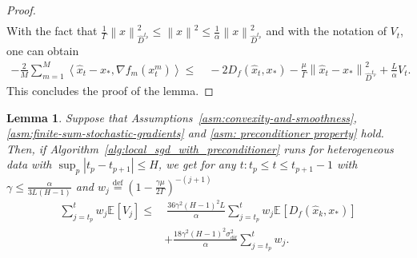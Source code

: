 \documentclass[sn-mathphys,Numbered]{sn-jnl}%
\newtheorem{lemma}{Lemma}%
\renewcommand{\|}{\parallel}
\newcommand\ec[2][]{\ensuremath{\mathbb{E}_{#1} \left[#2\right]}}
\newcommand\ev[1]{\left \langle #1 \right \rangle}
\newcommand\br[1]{\left ( #1 \right )}
\newcommand{\sqn}[1]{{\left\lVert#1\right\rVert}^2}
\newcommand{\abs}[1]{\left\lvert#1\right\rvert}
\newcommand{\eqdef}{\overset{\text{def}}{=}}
\newcommand{\sigmaf}{\sigma_{\mathrm{dif}}}
\renewcommand {\*} {\ast}
\begin{document}
\begin{proof}
\begin{align*}
    \end{align*}
    With the fact that $\frac{1}{\Gamma}\sqn{x}_{\hat{D}^{t_p}} \leq \sqn{x} \leq \frac{1}{\alpha}\sqn{x}_{\hat{D}^{t_p}}$ and with the notation of $V_t$, one can obtain
     \begin{align*}
        -\frac{2 }{M} \sum_{m=1}^{M} \ev{\hat{x}_t - x_\ast, \nabla f_m (x_t^m)} \leq&\ - 2  D_{f} (\hat{x}_t, x_\ast) -  \frac{\mu}{\Gamma} \sqn{\hat{x}_t - x_\ast}_{\hat{D}^{t_p}} +  \frac{L}{\alpha} V_t.
    \end{align*}
    This concludes the proof of the lemma.
\end{proof}

\begin{lemma}
    \label{lemma:iterate-deviation-epoch}
    Suppose that Assumptions~\ref{asm:convexity-and-smoothness}, \ref{asm:finite-sum-stochastic-gradients} and \ref{asm: preconditioner property} hold. Then, if Algorithm~\ref{alg:local_sgd_with_preconditioner} runs for heterogeneous data with $\sup_{p} \abs{t_p - t_{p+1}} \leq H$, we get for any $t: t_p \leq t \leq t_{p+1} - 1$ with $\gamma \leq \frac{\alpha}{3 L \br{H - 1}}$ and $w_j \eqdef \br{1 - \frac{\gamma\mu}{2\Gamma}}^{-(j+1)}$
    \begin{align}
        \sum\limits_{j=t_p}^t w_j \ec{V_j} \leq&\  \frac{36\gamma^2(H-1)^2 L}{\alpha}\sum\limits_{j=t_p}^t w_j  \ec{D_{f} (\hat{x}_k, x_\ast)} \nonumber \\
       &+  \frac{18\gamma^2(H-1)^2  \sigmaf^2}{\alpha}\sum\limits_{j=t_p}^t w_j. \nonumber
    \end{align}
\end{lemma}
\end{document}
